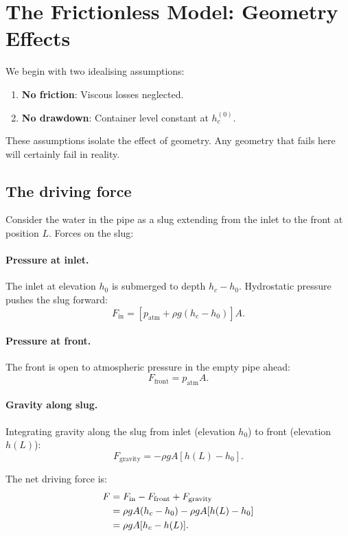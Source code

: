 \documentclass[11pt]{article}
\begin{document}
\section{The Frictionless Model: Geometry Effects}
\label{sec:frictionless}

We begin with two idealising assumptions:
\begin{enumerate}[nosep,leftmargin=2em]
  \item \textbf{No friction}: Viscous losses neglected.
  \item \textbf{No drawdown}: Container level constant at $h_c^{(0)}$.
\end{enumerate}

These assumptions isolate the effect of geometry. Any geometry that fails here will certainly fail in reality.

\subsection{The driving force}

Consider the water in the pipe as a slug extending from the inlet to the front at position $L$. Forces on the slug:

\paragraph{Pressure at inlet.} The inlet at elevation $h_0$ is submerged to depth $h_c - h_0$. Hydrostatic pressure pushes the slug forward:
\[
  F_{\text{in}} = [p_{\text{atm}} + \rho g(h_c - h_0)] A.
\]

\paragraph{Pressure at front.} The front is open to atmospheric pressure in the empty pipe ahead:
\[
  F_{\text{front}} = p_{\text{atm}} A.
\]

\paragraph{Gravity along slug.} Integrating gravity along the slug from inlet (elevation $h_0$) to front (elevation $h(L)$):
\[
  F_{\text{gravity}} = -\rho g A [h(L) - h_0].
\]

The net driving force is:
\begin{align}
  F &= F_{\text{in}} - F_{\text{front}} + F_{\text{gravity}} \notag \\
    &= \rho g A (h_c - h_0) - \rho g A [h(L) - h_0] \notag \\
    &= \rho g A [h_c - h(L)].
  \label{eq:driving-force}
\end{align}
\end{document}
